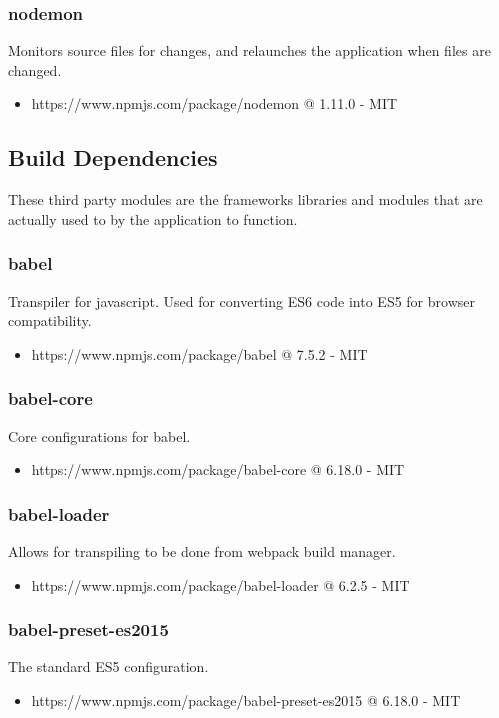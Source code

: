   \subsubsection{nodemon}
  Monitors source files for changes, and relaunches the application when files are changed.
  \begin{itemize}
    \item https://www.npmjs.com/package/nodemon @ 1.11.0 - MIT
  \end{itemize}

\subsection{Build Dependencies}
  These third party modules are the frameworks libraries and modules that are actually used to by the application to function. 

  \subsubsection{babel}
  Transpiler for javascript. Used for converting ES6 code into ES5 for browser compatibility.
  \begin{itemize}
    \item https://www.npmjs.com/package/babel @ 7.5.2 - MIT
  \end{itemize}

  \subsubsection{babel-core}
  Core configurations for babel.
  \begin{itemize}
    \item https://www.npmjs.com/package/babel-core @ 6.18.0 - MIT
  \end{itemize}

  \subsubsection{babel-loader}
  Allows for transpiling to be done from webpack build manager.
  \begin{itemize}
    \item https://www.npmjs.com/package/babel-loader @ 6.2.5 - MIT
  \end{itemize}

  \subsubsection{babel-preset-es2015}
  The standard ES5 configuration.
  \begin{itemize}
    \item https://www.npmjs.com/package/babel-preset-es2015 @ 6.18.0 - MIT
  \end{itemize}

